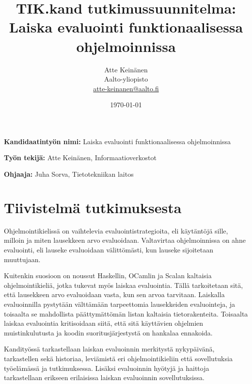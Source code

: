 \documentclass[12pt,a4paper,finnish,oneside]{article}
\begin{document}

\title{TIK.kand tutkimussuunnitelma:\\[5mm] Laiska evaluointi funktionaalisessa ohjelmoinnissa}

\author{Atte Keinänen\\
Aalto-yliopisto\\
\url{atte-keinanen@aalto.fi}}

\date{\today}

\maketitle

%

\textbf{Kandidaatintyön nimi:} Laiska evaluointi funktionaalisessa ohjelmoinnissa

\textbf{Työn tekijä:} Atte Keinänen, Informaatioverkostot

\textbf{Ohjaaja:} Juha Sorva, Tietotekniikan laitos


\section{Tiivistelmä tutkimuksesta}

Ohjelmointikielissä on vaihtelevia evaluointistrategioita, eli käytäntöjä sille, milloin ja miten lausekkeen arvo evaluoidaan. Valtavirtaa ohjelmoinnissa on ahne evaluointi, eli lauseke evaluoidaan välittömästi, kun lauseke sijoitetaan muuttujaan.

Kuitenkin suosioon on noussut Haskellin, OCamlin ja Scalan kaltaisia ohjelmointikieliä, jotka tukevat myös laiskaa evaluointia. Tällä tarkoitetaan sitä, että lausekkeen arvo evaluoidaan vasta, kun sen arvoa tarvitaan. Laiskalla evaluoinnilla pystytään välttämään tarpeettomia lausekkeiden evaluointeja, ja toisaalta se mahdollista päättymättömän listan kaltaisia tietorakenteita. Toisaalta laiskaa evaluointia kritisoidaan siitä, että sitä käyttävien ohjelmien muistinkulutusta ja koodin suoritusjärjestystä on hankalaa ennakoida.

Kandityössä tarkastellaan laiskan evaluoinnin merkitystä nykypäivänä, tarkastellen sekä historiaa, leviämistä eri ohjelmointikieliin että sovellutuksia työelämässä ja tutkimuksessa. Lisäksi evaluoinnin hyötyjä ja haittoja tarkastellaan erikseen erilaisissa laiskan evaluoinnin sovellutuksissa.
\end{document}
